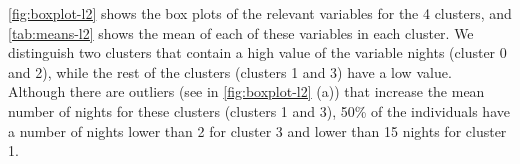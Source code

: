 \begin{table}[]
{}
\caption{Clusters based on actual resident labels using $\ell^2$ normalization.}
\label{tab:l2-perc}
\end{table}

\cref{fig:boxplot-l2} shows the box plots of the relevant variables for the 4 clusters, and \cref{tab:means-l2} shows the mean of each of these variables in each cluster. We distinguish two clusters that contain a high value of the variable nights (cluster 0 and 2), while the rest of the clusters (clusters 1 and 3) have a low value. Although there are outliers (see in \cref{fig:boxplot-l2} (a)) that increase the mean number of nights for these clusters (clusters 1 and 3), 50\% of the individuals have a number of nights lower than 2 for cluster 3 and lower than 15 nights for cluster 1. 

